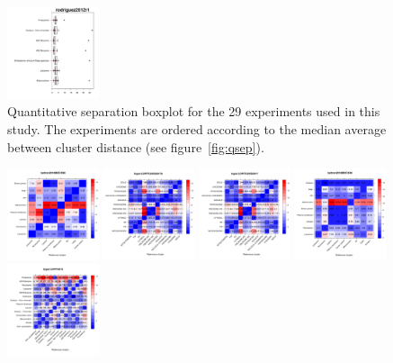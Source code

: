 \documentclass[12pt]{article}\usepackage[]{graphicx}\usepackage[]{color}
\begin{document}
\begin{figure}[p]
  \includegraphics[width = 0.24\textwidth]{./figure/allqseps-20.pdf}
  \caption{Quantitative separation boxplot for the 29
    experiments used in this study. The experiments are ordered
    according to the median average between cluster distance (see
    figure~\ref{fig:qsep}). }
  \label{fig:allqseps}
\end{figure}

\begin{figure}[p]
  \centering
  \includegraphics[width = 0.24\textwidth]{./figure/allhmaps-1.pdf}
  \includegraphics[width = 0.24\textwidth]{./figure/allhmaps-2.pdf}
  \includegraphics[width = 0.24\textwidth]{./figure/allhmaps-3.pdf}
  \includegraphics[width = 0.24\textwidth]{./figure/allhmaps-4.pdf}
  \includegraphics[width = 0.24\textwidth]{./figure/allhmaps-5.pdf}

\end{figure}
\end{document}
